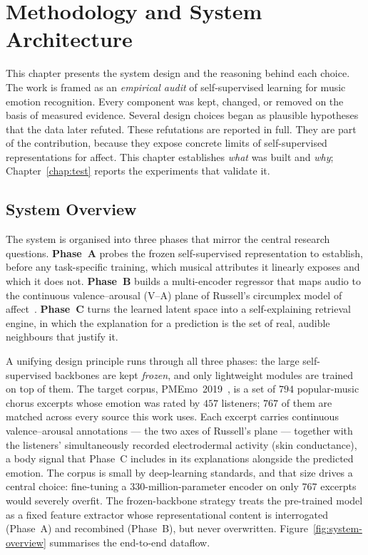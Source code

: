 \documentclass[12pt]{report}
\begin{document}
% 
% 

\chapter{Methodology and System Architecture}
\label{ch4}

This chapter presents the system design and the reasoning behind each choice. The work is framed as an \emph{empirical audit} of self-supervised learning for music emotion recognition. Every component was kept, changed, or removed on the basis of measured evidence. Several design choices began as plausible hypotheses that the data later refuted. These refutations are reported in full. They are part of the contribution, because they expose concrete limits of self-supervised representations for affect. This chapter establishes \emph{what} was built and \emph{why}; Chapter~\ref{chap:test} reports the experiments that validate it.

\section{System Overview}
\label{sec:overview}

The system is organised into three phases that mirror the central research questions. \textbf{Phase~A} probes the frozen self-supervised representation to establish, before any task-specific training, which musical attributes it linearly exposes and which it does not. \textbf{Phase~B} builds a multi-encoder regressor that maps audio to the continuous valence--arousal (V--A) plane of Russell's circumplex model of affect~\cite{russell_circumplex_1980}. \textbf{Phase~C} turns the learned latent space into a self-explaining retrieval engine, in which the explanation for a prediction is the set of real, audible neighbours that justify it.

A unifying design principle runs through all three phases: the large self-supervised backbones are kept \emph{frozen}, and only lightweight modules are trained on top of them. The target corpus, PMEmo~2019~\cite{zhang_pmemo_2018}, is a set of $794$ popular-music chorus excerpts whose emotion was rated by $457$ listeners; $767$ of them are matched across every source this work uses. Each excerpt carries continuous valence--arousal annotations --- the two axes of Russell's plane --- together with the listeners' simultaneously recorded electrodermal activity (skin conductance), a body signal that Phase~C includes in its explanations alongside the predicted emotion. The corpus is small by deep-learning standards, and that size drives a central choice: fine-tuning a $330$-million-parameter encoder on only $767$ excerpts would severely overfit. The frozen-backbone strategy treats the pre-trained model as a fixed feature extractor whose representational content is interrogated (Phase~A) and recombined (Phase~B), but never overwritten. Figure~\ref{fig:system-overview} summarises the end-to-end dataflow.
\end{document}
